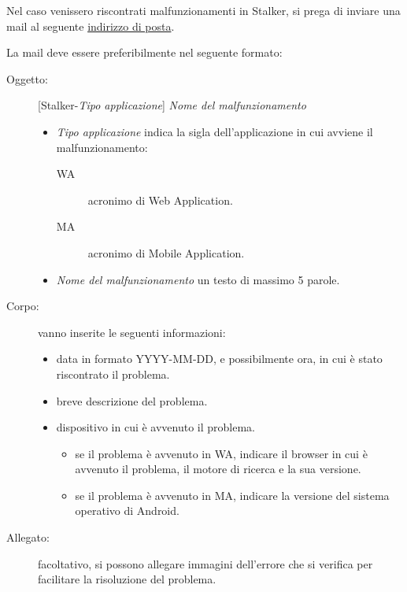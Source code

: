 \documentclass[../manuale-utente.tex]{subfiles}
\begin{document}
Nel caso venissero riscontrati malfunzionamenti in Stalker, si prega di inviare una mail al seguente \href{mailto:gruppone.swe@gmail.com}{indirizzo di posta}. 

La mail deve essere preferibilmente nel seguente formato:
\begin{description}
    \item[Oggetto:] [Stalker-\textit{Tipo applicazione}] \textit{Nome del malfunzionamento}
    \begin{itemize}
        \item \textit{Tipo applicazione} indica la sigla dell'applicazione in cui avviene il malfunzionamento:
        \begin{description}
            \item[WA] acronimo di Web Application.
            \item[MA] acronimo di Mobile Application.
        \end{description}
        \item \textit{Nome del malfunzionamento} un testo di massimo 5 parole.
    \end{itemize}
    
    \item[Corpo:] vanno inserite le seguenti informazioni:
    \begin{itemize}
        \item data in formato YYYY-MM-DD, e possibilmente ora, in cui è stato riscontrato il problema.
        \item breve descrizione del problema.
        \item dispositivo in cui è avvenuto il problema.
        \begin{itemize}
            \item se il problema è avvenuto in WA, indicare il browser in cui è avvenuto il problema, il motore di ricerca e la sua versione.
            \item se il problema è avvenuto in MA, indicare la versione del sistema operativo di Android.
        \end{itemize}
    \end{itemize} 

    \item[Allegato:] facoltativo, si possono allegare immagini dell'errore che si verifica per facilitare la risoluzione del problema. 
\end{description}
\end{document}
